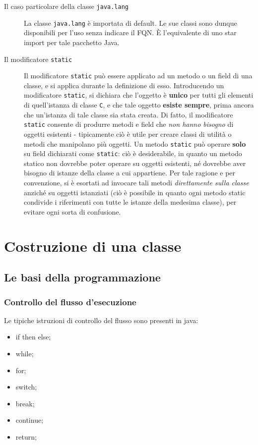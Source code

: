 \documentclass[\fontsizeclass,twocolumn]{\classname}
\theoremstyle{definition}
\theoremstyle{definition}
\begin{document}
\begin{description}
    \item[Il caso particolare della classe \texttt{java.lang}] La classe
        \texttt{java.lang} è importata di default. Le sue classi sono dunque
        disponibili per l'uso senza indicare il FQN. È l'equivalente di uno
        star import per tale pacchetto Java.
    \item[Il modificatore \texttt{static}] Il modificatore \texttt{static} può
        essere applicato ad un metodo o un field di una classe, e si applica
        durante la definizione di esso. Introducendo un modificatore
        \texttt{static}, si dichiara che l'oggetto è \textbf{unico} per tutti
        gli elementi di quell'istanza di classe \texttt{C}, e che tale oggetto
        \textbf{esiste sempre}, prima ancora che un'istanza di tale classe sia
        stata creata. Di fatto, il modificatore \texttt{static} consente di
        produrre metodi e field che \emph{non hanno bisogno} di oggetti
        esistenti \-- tipicamente ciò è utile per creare classi di utilità o
        metodi che manipolano più oggetti. Un metodo \texttt{static} può
        operare \textbf{solo} su field dichiarati come \texttt{static}: ciò è
        desiderabile, in quanto un metodo statico non dovrebbe poter operare su
        oggetti esistenti, né dovrebbe aver bisogno di istanze della classe a
        cui appartiene. Per tale ragione e per convenzione, si è esortati ad
        invocare tali metodi \emph{direttamente sulla classe} anziché su
        oggetti istanziati (ciò è possibile in quanto ogni metodo static
        condivide i riferimenti con tutte le istanze della medesima classe),
        per evitare ogni sorta di confusione.
\end{description}



\chapter{Costruzione di una classe}

\section{Le basi della programmazione}

\subsection{Controllo del flusso d'esecuzione}

Le tipiche istruzioni di controllo del flusso sono presenti in java:
\begin{itemize}
    \item if then else;
    \item while;
    \item for;
    \item switch;
    \item break;
    \item continue;
    \item return;
\end{itemize}
\end{document}
